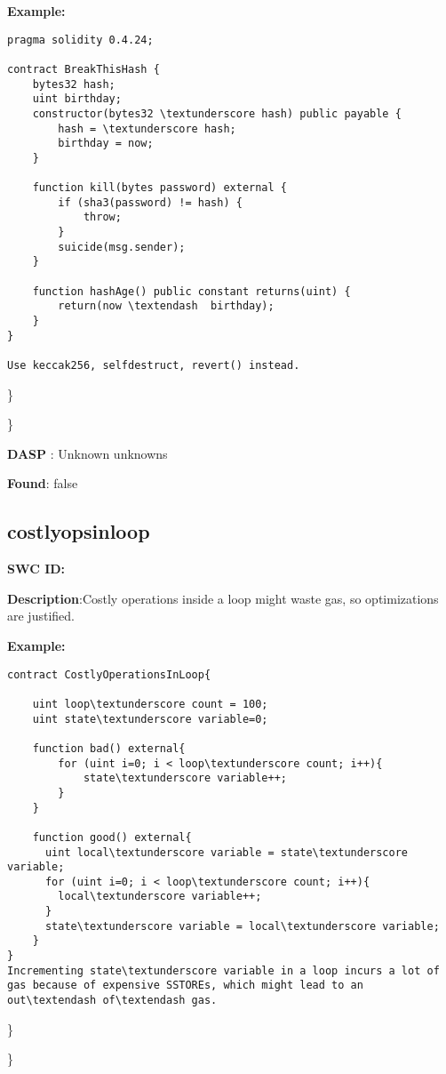 \documentclass{article}
\begin{document}
\textbf{Example:} 
\begin{verbatim}
pragma solidity 0.4.24;

contract BreakThisHash {
    bytes32 hash;
    uint birthday;
    constructor(bytes32 \textunderscore hash) public payable {
        hash = \textunderscore hash;
        birthday = now;
    }

    function kill(bytes password) external {
        if (sha3(password) != hash) {
            throw;
        }
        suicide(msg.sender);
    }

    function hashAge() public constant returns(uint) {
        return(now \textendash  birthday);
    }
}

Use keccak256, selfdestruct, revert() instead.

\end{verbatim}\} 

\} 

\textbf{DASP} : Unknown unknowns

\textbf{Found}: false

\subsection{costly\textunderscore ops\textunderscore in\textunderscore loop} 
\textbf{SWC \textunderscore ID:} 

\textbf{Description}:Costly operations inside a loop might waste gas, so optimizations are justified.


\textbf{Example:} 
\begin{verbatim}
contract CostlyOperationsInLoop{

    uint loop\textunderscore count = 100;
    uint state\textunderscore variable=0;

    function bad() external{
        for (uint i=0; i < loop\textunderscore count; i++){
            state\textunderscore variable++;
        }
    }

    function good() external{
      uint local\textunderscore variable = state\textunderscore variable;
      for (uint i=0; i < loop\textunderscore count; i++){
        local\textunderscore variable++;
      }
      state\textunderscore variable = local\textunderscore variable;
    }
}
Incrementing state\textunderscore variable in a loop incurs a lot of gas because of expensive SSTOREs, which might lead to an out\textendash of\textendash gas.

\end{verbatim}\} 

\} 
\end{document}
